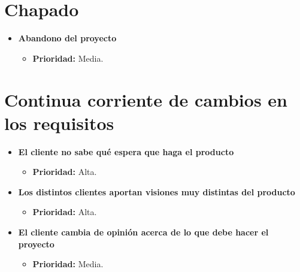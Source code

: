 \documentclass[spanish,a4paper,11pt, twoside]{report}	%
\begin{document}
\section{Chapado}
	\begin{itemize}
		\item \textbf{Abandono del proyecto}
			\begin{itemize}
				\item \textbf{Prioridad: }Media.			%
			\end{itemize}
	\end{itemize}
%
\section{Continua corriente de cambios en los requisitos}
	\begin{itemize}
		
		\item \textbf{El cliente no sabe qué espera que haga el producto}	%
			\begin{itemize}
				\item \textbf{Prioridad: }Alta.
			\end{itemize}
		
		\item \textbf{Los distintos clientes aportan visiones muy distintas del producto}	%
			\begin{itemize}
				\item \textbf{Prioridad: }Alta.
			\end{itemize}

		\item \textbf{El cliente cambia de opinión acerca de lo que debe hacer el proyecto}
			\begin{itemize}
				\item \textbf{Prioridad: }Media.
			\end{itemize}
	\end{itemize}
%
\end{document}
